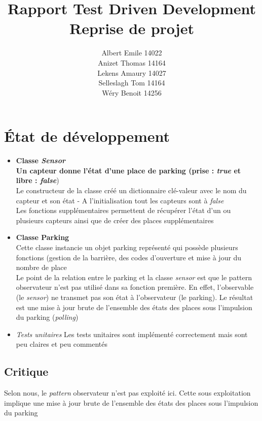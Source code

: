 \documentclass[10pt,a4paper]{article}
\begin{document}
\title{Rapport Test Driven Development\\Reprise de projet}
\author{Albert Emile 14022\\Anizet Thomas 14164\\Lekens Amaury 14027\\Selleslagh Tom 14164\\Wéry Benoit 14256}
\maketitle

\section{\'Etat de développement}
\begin{itemize}
\item \textbf{Classe \textit{Sensor\\}
Un capteur donne l'état d'une place de parking (prise : \textit{true} et libre : \textit{false}})\\

Le constructeur de la classe créé un dictionnaire clé-valeur avec le nom du capteur et son état - A l'initialisation tout les capteurs sont à \textit{false}\\

Les fonctions supplémentaires permettent de récupérer l'état d'un ou plusieurs capteurs ainsi que de créer des places supplémentaires

\item \textbf{Classe Parking\\}
Cette classe instancie un objet parking représenté qui possède plusieurs fonctions (gestion de la barrière, des codes d'ouverture et mise à jour du nombre de place \\

Le point de la relation entre le parking et la classe \textit{sensor} est que le pattern observateur n'est pas utilisé dans sa fonction première. En effet, l'observable (le \textit{sensor}) ne transmet pas son état à l'observateur (le parking). Le résultat est une mise à jour brute de l'ensemble des états des places sous l'impulsion du parking (\textit{polling})

\item \textit{Tests unitaires}
Les tests unitaires sont implémenté correctement mais sont peu claires et peu commentés
\end{itemize}

\subsection{Critique}
Selon nous, le \textit{pattern} observateur n'est pas exploité ici. Cette sous exploitation implique une mise à jour brute de l'ensemble des états des places sous l'impulsion du parking\\
\end{document}
